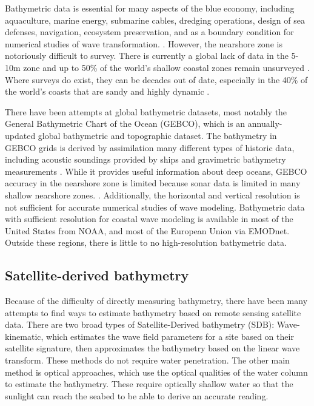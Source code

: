 Bathymetric data is essential for many aspects of the blue economy, including aquaculture, marine energy, submarine cables, dredging operations, design of sea defenses, navigation, ecosystem preservation, and as a boundary condition for numerical studies of wave transformation. \parencite{Cesbron2021,Ashphaq2021}. However, the nearshore zone is notoriously difficult to survey. There is currently a global lack of data in the 5-10m zone \parencite{Albright2021} and up to 50\% of the world's shallow coastal zones remain unsurveyed \parencite{IHO/OHI2022}. Where surveys do exist, they can be decades out of date, especially in the 40\% of the world's coasts that are sandy and highly dynamic \parencite{Almar2021e}.

There have been attempts at global bathymetric datasets, most notably the General Bathymetric Chart of the Ocean (GEBCO), which is an annually-updated global bathymetric and topographic dataset. The bathymetry in GEBCO grids is derived by assimilation many different types of historic data, including  acoustic soundings provided by ships and gravimetric bathymetry measurements \parencite{Cesbron2021}. While it provides useful information about deep oceans, GEBCO accuracy in the nearshore zone is limited because sonar data is limited in many shallow nearshore zones. \parencite{Monteys2015}. Additionally, the horizontal and vertical resolution is not sufficient for accurate numerical studies of wave modeling. Bathymetric data with sufficient resolution for coastal wave modeling is available in most of the United States from NOAA, and most of the European Union via EMODnet. Outside these regions, there is little to no high-resolution bathymetric data. 

\subsection{Satellite-derived bathymetry}
Because of the difficulty of directly measuring bathymetry, there have been many attempts to find ways to estimate bathymetry based on remote sensing satellite data. There are two broad types of Satellite-Derived bathymetry (SDB): Wave-kinematic, which estimates the wave field parameters for a site based on their satellite signature, then approximates the bathymetry based on the linear wave transform. These methods do not require water penetration. The other main method is optical approaches, which use the optical qualities of the water column to estimate the bathymetry. These require optically shallow water so that the sunlight can reach the seabed to be able to derive an accurate reading. 

